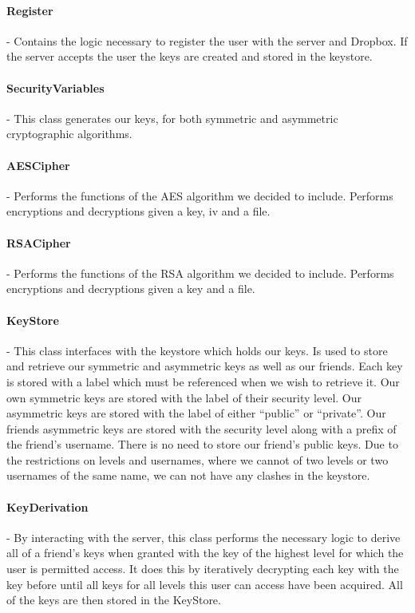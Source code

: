 \documentclass[12pt, titlepage]{article}
\begin{document}
\paragraph*{Register} - Contains the logic necessary to register the user with the server and Dropbox. If the server accepts the user the keys are created and stored in the keystore.
\paragraph*{SecurityVariables} - This class generates our keys, for both symmetric and asymmetric cryptographic algorithms.
\paragraph*{AESCipher} - Performs the functions of the AES algorithm we decided to include. Performs encryptions and decryptions given a key, iv and a file.
\paragraph*{RSACipher} - Performs the functions of the RSA algorithm we decided to include. Performs encryptions and decryptions given a key and a file.
\paragraph*{KeyStore} - This class interfaces with the keystore which holds our keys. Is used to store and retrieve our symmetric and asymmetric keys as well as our friends. Each key is stored with a label which must be referenced when we wish to retrieve it. Our own symmetric keys are stored with the label of their security level. Our asymmetric keys are stored with the label of either ``public'' or ``private''. Our friends asymmetric keys are stored with the security level along with a prefix of the friend's username. There is no need to store our friend's public keys. Due to the restrictions on levels and usernames, where we cannot of two levels or two usernames of the same name, we can not have any clashes in the keystore.
\paragraph*{KeyDerivation} - By interacting with the server, this class performs the necessary logic to derive all of a friend's keys when granted with the key of the highest level for which the user is permitted access. It does this by iteratively decrypting each key with the key before until all keys for all levels this user can access have been acquired. All of the keys are then stored in the KeyStore.
\end{document}
